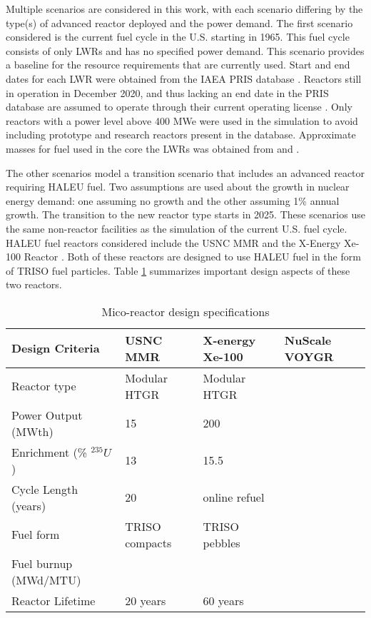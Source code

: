 Multiple scenarios are considered in this work, with each scenario differing
by the type(s) of advanced reactor deployed and the power demand. The first 
scenario considered 
is the current fuel cycle in the U.S. starting in 1965. This fuel cycle 
consists of only \glspl{LWR}
and has no specified power demand. This scenario provides a baseline for 
the resource requirements that are currently used. Start and 
end dates for each \gls{LWR} were obtained from the \gls{IAEA} \gls{PRIS} database 
\cite{noauthor_power_1989}. Reactors still in operation in December 2020, and thus 
lacking an end date in the \gls{PRIS} database are assumed to operate through their 
current operating license 
\cite{noauthor_initial_2021,noauthor_second_2021,noauthor_watts_2021,noauthor_watts_2021-1,noauthor_clinton_2021,noauthor_comanche_2021,noauthor_comanche_2021-1,noauthor_perry_2021}. 
Only reactors with a power level above 400 MWe were used in the simulation 
to avoid including prototype and research reactors present in the database. 
Approximate masses for fuel used in the core the \gls{LWR}s was obtained 
from \cite{todreas_nuclear_2012} and \cite{cacuci_handbook_2010}. 

The other scenarios model a transition scenario that includes an advanced 
reactor requiring \gls{HALEU} fuel. Two assumptions are used about the growth 
in nuclear energy demand: one assuming no growth and the other assuming 
1\% annual growth. The transition to the new reactor type starts in 2025. 
These scenarios use the same  
non-reactor facilities as the simulation of the current 
U.S. fuel cycle. \gls{HALEU} fuel reactors 
considered include the \gls{USNC} \gls{MMR}
\cite{mitchell_usnc_2020} and the X-Energy Xe-100 
Reactor \cite{harlan_x-energy_2018}\cite{hussain_advances_2018}. Both of 
these reactors are designed 
to use \gls{HALEU} fuel in the form of \gls{TRISO} fuel particles. Table 
\ref{tab:reactor_summary} summarizes important design aspects of these two reactors.

\begin{table}[ht]
    \centering
    \caption{Mico-reactor design specifications}
    \label{tab:reactor_summary}
    \begin{tabular}{p{5cm}p{3cm}p{3cm}p{3cm}}
        \hline
        Design Criteria & \gls{USNC} \gls{MMR} & 
            X-energy Xe-100 & NuScale VOYGR \\\hline
        Reactor type & Modular HTGR & Modular HTGR & \\
        Power Output (MWth) & 15 & 200 & \\
        Enrichment (\% $^{235}U$) & 13 & 15.5 & \\
        Cycle Length (years) & 20 & online refuel &\\
        Fuel form & \gls{TRISO} compacts & \gls{TRISO} pebbles &\\
        Fuel burnup (MWd/MTU) & & & \\
        Reactor Lifetime & 20 years & 60 years & \\
        \hline
    \end{tabular}
\end{table}
    

